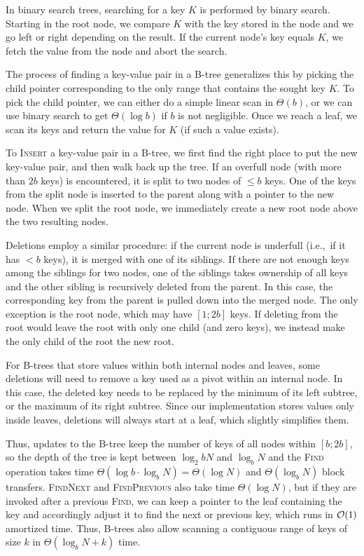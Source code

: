 In binary search trees, searching for a key $K$ is performed by binary search.
Starting in the root node, we compare $K$ with the key stored in the node
and we go left or right depending on the result. If the current node's key
equals $K$, we fetch the value from the node and abort the search.

The process of finding a key-value pair in a B-tree generalizes this
by picking the child pointer corresponding to the only range that contains
the sought key $K$. To pick the child pointer, we can either do a simple
linear scan in $\Theta(b)$, or we can use binary search to get
$\Theta(\log b)$ if $b$ is not negligible.
Once we reach a leaf, we scan its keys and return the value for $K$
(if such a value exists).

To \textsc{Insert} a key-value pair in a B-tree, we first find the right
place to put the new key-value pair, and then walk back up the tree.
If an overfull node (with more than $2b$ keys) is encountered, it is split
to two nodes of $\leq b$ keys. One of the keys from the split node
is inserted to the parent along with a pointer to the new node.
When we split the root node, we immediately create a new root node above the
two resulting nodes.

Deletions employ a similar procedure: if the current node is underfull
(i.e.,\ if it has $< b$ keys), it is merged with one of its siblings.
If there are not enough keys among the siblings for two nodes,
one of the siblings takes ownership of all keys and the other sibling
is recursively deleted from the parent. In this case, the corresponding
key from the parent is pulled down into the merged node.
The only exception is the root node, which may have $[1;2b]$ keys.
If deleting from the root would leave the root with only one child
(and zero keys), we instead make the only child of the root the new root.

For B-trees that store values within both internal nodes and leaves,
some deletions will need to remove a key used as a pivot within an internal
node. In this case, the deleted key needs to be replaced by the minimum of its
left subtree, or the maximum of its right subtree.
Since our implementation stores values only inside leaves, deletions will
always start at a leaf, which slightly simplifies them.

Thus, updates to the B-tree keep the number of keys of all nodes within
$[b;2b]$, so the depth of the tree is kept between $\log_2b N$ and $\log_b N$
and the \textsc{Find} operation takes time
$\Theta(\log b \cdot \log_b N)=\Theta(\log N)$ and $\Theta(\log_b N)$
block transfers. \textsc{FindNext} and \textsc{FindPrevious} also take time
$\Theta(\log N)$, but if they are invoked after a previous \textsc{Find}, we
can keep a pointer to the leaf containing the key and accordingly adjust it to
find the next or previous key, which runs in $\mathcal{O}(1)$ amortized time. Thus,
B-trees also allow scanning a contiguous range of keys of size $k$ in
$\Theta(\log_b N + k)$ time.

